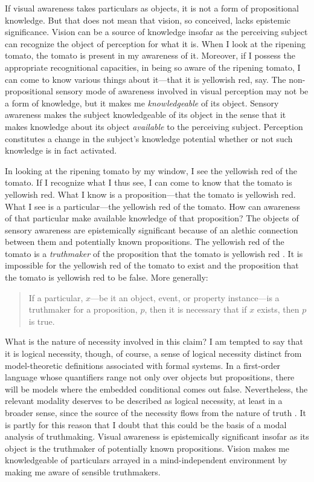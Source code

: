 \documentclass[12pt]{article}
\begin{document}
If visual awareness takes particulars as objects, it is not a form of propositional knowledge. But that does not mean that vision, so conceived, lacks epistemic significance. Vision can be a source of knowledge insofar as the perceiving subject can recognize the object of perception for what it is. When I look at the ripening tomato, the tomato is present in my awareness of it. Moreover, if I possess the appropriate recognitional capacities, in being so aware of the ripening tomato, I can come to know various things about it---that it is yellowish red, say. The non-propositional sensory mode of awareness involved in visual perception may not be a form of knowledge, but it makes me \emph{knowledgeable} of its object. Sensory awareness makes the subject knowledgeable of its object in the sense that it makes knowledge about its object \emph{available} to the perceiving subject. Perception constitutes a change in the subject's knowledge potential whether or not such knowledge is in fact activated.

In looking at the ripening tomato by my window, I see the yellowish red of the tomato. If I recognize what I thus see, I can come to know that the tomato is yellowish red. What I know is a proposition---that the tomato is yellowish red. What I see is a particular---the yellowish red of the tomato. How can awareness of that particular make available knowledge of that proposition? The objects of sensory awareness are epistemically significant because of an alethic connection between them and potentially known propositions. The yellowish red of the tomato is a \emph{truthmaker} of the proposition that the tomato is yellowish red \citep[see][]{Johnston:2006uq}. It is impossible for the yellowish red of the tomato to exist and the proposition that the tomato is yellowish red to be false. More generally:
\begin{quote}
	If a particular, \( x \)---be it an object, event, or property instance---is a truthmaker for a proposition, \( p \), then it is necessary that if \( x \) exists, then \( p \) is true. 
\end{quote}
What is the nature of necessity involved in this claim? I am tempted to say that it is logical necessity, though, of course, a sense of logical necessity distinct from model-theoretic definitions associated with formal systems. In a first-order language whose quantifiers range not only over objects but propositions, there will be models where the embedded conditional comes out false. Nevertheless, the relevant modality deserves to be described as logical necessity, at least in a broader sense, since the source of the necessity flows from the nature of truth \citep[for doubts about model-theoretic definitions of logical necessity see][]{Etchemendy:1988et,Etchemendy:1988sa}. It is partly for this reason that I doubt that this could be the basis of a modal analysis of truthmaking. Visual awareness is epistemically significant insofar as its object is the truthmaker of potentially known propositions. Vision makes me knowledgeable of particulars arrayed in a mind-independent environment by making me aware of sensible truthmakers.
\end{document}
